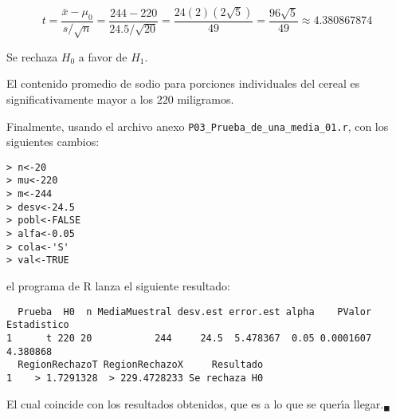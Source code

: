\begin{solucion}
 \begin{estadistico}
  \begin{equation*}
   t = \frac{\bar{x}-\mu_0}{s/\sqrt{n}} = \frac{244-220}{24.5/\sqrt{20}} = \frac{24(2)\left(2\sqrt{5}\right)}{49} = \frac{96\sqrt{5}}{49} \approx 4.380867874
  \end{equation*}
 \end{estadistico}

 \begin{decision}
  Se rechaza $H_0$ a favor de $H_1$.
 \end{decision}

 \begin{conclusion}
  El contenido promedio de sodio para porciones individuales del cereal es significativamente mayor a los $220$ miligramos.
 \end{conclusion}

 Finalmente, usando el archivo anexo \texttt{P03\_Prueba\_de\_una\_media\_01.r}, con los siguientes cambios:
 \vspace{-0.3cm}
 \begin{verbatim}
> n<-20
> mu<-220
> m<-244
> desv<-24.5
> pobl<-FALSE
> alfa<-0.05
> cola<-'S'
> val<-TRUE
 \end{verbatim}
 \vspace{-0.8cm}
 el programa de R lanza el siguiente resultado:
 \vspace{-0.3cm}
 \begin{verbatim}
  Prueba  H0  n MediaMuestral desv.est error.est alpha    PValor Estadistico
1      t 220 20           244     24.5  5.478367  0.05 0.0001607    4.380868
  RegionRechazoT RegionRechazoX     Resultado
1    > 1.7291328  > 229.4728233 Se rechaza H0
 \end{verbatim}
 \vspace{-0.8cm}
 El cual coincide con los resultados obtenidos, que es a lo que se quer\'{\i}a llegar.${}_{\blacksquare}$
\end{solucion}
